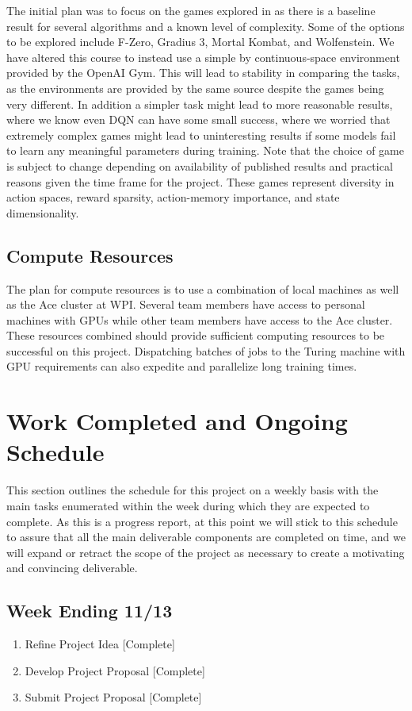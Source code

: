 \documentclass[conference]{IEEEtran}
\begin{document}
The initial plan was to focus on the games explored in \cite{bhonker2017playing} as there is a baseline result for several algorithms and a known level of complexity.
Some of the options to be explored include F-Zero, Gradius 3, Mortal Kombat, and Wolfenstein.
We have altered this course to instead use a simple by continuous-space environment provided by the OpenAI Gym. This will lead to stability in comparing the tasks, as the environments are provided by the same source despite the games being very different. In addition a simpler task might lead to more reasonable results, where we know even DQN can have some small success, where we worried that extremely complex games might lead to uninteresting results if some models fail to learn any meaningful parameters during training.
Note that the choice of game is subject to change depending on availability of published results and practical reasons given the time frame for the project.
These games represent diversity in action spaces, reward sparsity, action-memory importance, and state dimensionality.

\subsection{Compute Resources}
The plan for compute resources is to use a combination of local machines as well as the Ace cluster at WPI.
Several team members have access to personal machines with GPUs while other team members have access to the Ace cluster.
These resources combined should provide sufficient computing resources to be successful on this project.
Dispatching batches of jobs to the Turing machine with GPU requirements can also expedite and parallelize long training times.

\section{Work Completed and Ongoing Schedule} \label{deliverables}
This section outlines the schedule for this project on a weekly basis with the main tasks enumerated within the week during which they are expected to complete.
As this is a progress report, at this point we will stick to this schedule to assure that all the main deliverable components are completed on time, and we will expand or retract the scope of the project as necessary to create a motivating and convincing deliverable.

\subsection{Week Ending 11/13}
\begin{enumerate}
    \item Refine Project Idea [Complete]
    \item Develop Project Proposal [Complete]
    \item Submit Project Proposal [Complete]
\end{enumerate}
\end{document}
